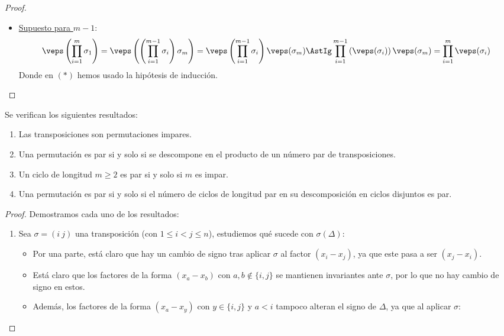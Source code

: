 \begin{prop}
\begin{proof}
\begin{itemize}
            \item \underline{Supuesto para $m-1$}:
                \begin{equation*}
                    \veps\left(\prod_{i=1}^{m}\sigma_1\right) = \veps\left(\left(\prod_{i=1}^{m-1}\sigma_i\right)\sigma_m\right) = \veps\left(\prod_{i=1}^{m-1}\sigma_i\right)\veps(\sigma_m) \AstIg \prod_{i=1}^{m-1}\left(\veps(\sigma_i)\right)\veps(\sigma_m) = \prod_{i=1}^{m}\veps(\sigma_i)
                \end{equation*}
                Donde en $(\ast)$ hemos usado la hipótesis de inducción.
        \end{itemize}
    \end{proof}
\end{prop}

\begin{prop}
    Se verifican los siguientes resultados:
    \begin{enumerate}
        \item Las transposiciones son permutaciones impares.
        \item Una permutación es par si y solo si se descompone en el producto de un número par de transposiciones.
        \item Un ciclo de longitud $m\geq 2$ es par si y solo si $m$ es impar.
        \item Una permutación es par si y solo si el número de ciclos de longitud par en su descomposición en ciclos disjuntos es par.
    \end{enumerate}
    \begin{proof}
        Demostramos cada uno de los resultados:
        \begin{enumerate}
            \item Sea $\sigma=(i\ j)$ una transposición (con $1\leq i <j\leq n$), estudiemos qué sucede con $\sigma(\Delta)$:
                \begin{itemize}
                    \item Por una parte, está claro que hay un cambio de signo tras aplicar $\sigma$ al factor $(x_i - x_j)$, ya que este pasa a ser $(x_j - x_i)$.
                    \item Está claro que los factores de la forma $(x_a - x_b)$ con $a,b \notin \{i,j\}$ se mantienen invariantes ante $\sigma$, por lo que no hay cambio de signo en estos.
                    \item Además, los factores de la forma $(x_a - x_y)$ con $y \in \{i,j\}$ y $a < i$ tampoco alteran el signo de $\Delta$, ya que al aplicar $\sigma$:

\end{itemize}
\end{enumerate}
\end{proof}
\end{prop}
